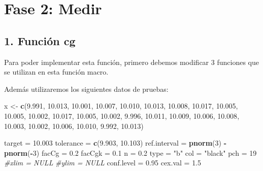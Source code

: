 \documentclass[
]{book}
\newenvironment{Shaded}{\begin{snugshade}}{\end{snugshade}}
\newcommand{\CommentTok}[1]{\textcolor[rgb]{0.56,0.35,0.01}{\textit{#1}}}
\newcommand{\DecValTok}[1]{\textcolor[rgb]{0.00,0.00,0.81}{#1}}
\newcommand{\FloatTok}[1]{\textcolor[rgb]{0.00,0.00,0.81}{#1}}
\newcommand{\FunctionTok}[1]{\textcolor[rgb]{0.13,0.29,0.53}{\textbf{#1}}}
\newcommand{\NormalTok}[1]{#1}
\newcommand{\OtherTok}[1]{\textcolor[rgb]{0.56,0.35,0.01}{#1}}
\newcommand{\SpecialCharTok}[1]{\textcolor[rgb]{0.81,0.36,0.00}{\textbf{#1}}}
\newcommand{\StringTok}[1]{\textcolor[rgb]{0.31,0.60,0.02}{#1}}
\begin{document}
\hypertarget{fase-2-medir-1}{%
\section{Fase 2: Medir}\label{fase-2-medir-1}}

\hypertarget{funciuxf3n-cg}{%
\subsection{1. Función cg}\label{funciuxf3n-cg}}

Para poder implementar esta función, primero debemos modificar 3 funciones que se utilizan en esta función macro.

Además utilizaremos los siguientes datos de pruebas:

\begin{Shaded}
\begin{Highlighting}[]
\NormalTok{x }\OtherTok{\textless{}{-}} \FunctionTok{c}\NormalTok{(}\FloatTok{9.991}\NormalTok{, }\FloatTok{10.013}\NormalTok{, }\FloatTok{10.001}\NormalTok{, }\FloatTok{10.007}\NormalTok{, }\FloatTok{10.010}\NormalTok{, }\FloatTok{10.013}\NormalTok{, }\FloatTok{10.008}\NormalTok{, }\FloatTok{10.017}\NormalTok{, }\FloatTok{10.005}\NormalTok{, }\FloatTok{10.005}\NormalTok{, }\FloatTok{10.002}\NormalTok{, }\FloatTok{10.017}\NormalTok{, }\FloatTok{10.005}\NormalTok{, }\FloatTok{10.002}\NormalTok{, }\FloatTok{9.996}\NormalTok{, }\FloatTok{10.011}\NormalTok{, }\FloatTok{10.009}\NormalTok{, }\FloatTok{10.006}\NormalTok{, }\FloatTok{10.008}\NormalTok{, }\FloatTok{10.003}\NormalTok{, }\FloatTok{10.002}\NormalTok{, }\FloatTok{10.006}\NormalTok{, }\FloatTok{10.010}\NormalTok{, }\FloatTok{9.992}\NormalTok{, }\FloatTok{10.013}\NormalTok{)}

\NormalTok{target }\OtherTok{=} \FloatTok{10.003}
\NormalTok{tolerance }\OtherTok{=} \FunctionTok{c}\NormalTok{(}\FloatTok{9.903}\NormalTok{, }\FloatTok{10.103}\NormalTok{)}
\NormalTok{ref.interval }\OtherTok{=} \FunctionTok{pnorm}\NormalTok{(}\DecValTok{3}\NormalTok{) }\SpecialCharTok{{-}} \FunctionTok{pnorm}\NormalTok{(}\SpecialCharTok{{-}}\DecValTok{3}\NormalTok{)}
\NormalTok{facCg }\OtherTok{=} \FloatTok{0.2}
\NormalTok{facCgk }\OtherTok{=} \FloatTok{0.1} 
\NormalTok{n }\OtherTok{=} \FloatTok{0.2}
\NormalTok{type }\OtherTok{=} \StringTok{"b"}
\NormalTok{col }\OtherTok{=} \StringTok{"black"}
\NormalTok{pch }\OtherTok{=} \DecValTok{19}
\CommentTok{\#xlim = NULL}
\CommentTok{\#ylim = NULL}
\NormalTok{conf.level }\OtherTok{=} \FloatTok{0.95}
\NormalTok{cex.val }\OtherTok{=} \FloatTok{1.5}
\end{Highlighting}
\end{Shaded}
\end{document}
